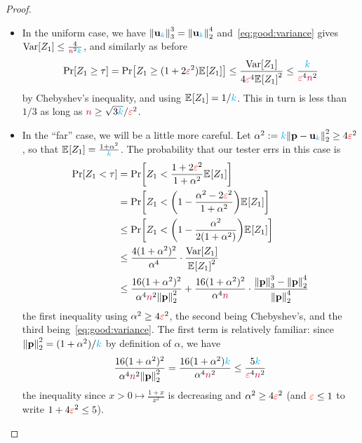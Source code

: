 \begin{proof}
  \begin{itemize}
    \item In the uniform case, we have $\norm{\uniform_\ab}_3^3=\normtwo{\uniform_\ab}^4$ and~\cref{eq:good:variance} gives $\operatorname{Var}[Z_1] \leq \frac{4}{{\textcolor{purple}{n}}^2{\textcolor{cyan}{k}}}$, and similarly as before
    \[
    \bPr{Z_1 \geq \tau} = \bPr{Z_1 \geq (1+2\dst^2)\bEE{Z_1}} \leq \frac{\Var[Z_1]}{4\dst^4\bEE{Z_1}^2}
    \leq \frac{\ab}{\dst^4\ns^2}
    \]
    by Chebyshev's inequality, and using $\bEE{Z_1}=1/\ab$. This in turn is less than $1/3$ as long as ${\textcolor{purple}{n}} \geq \sqrt{3{\textcolor{cyan}{k}}}/\textcolor{red}{\varepsilon}^2$.
    \item In the ``far'' case, we will be a little more careful. Let $\alpha^2 \eqdef \ab\normtwo{\p-\uniform_\ab}^2 \geq 4\dst^2$, so that $\bEE{Z_1} = \frac{1+\alpha^2}{\ab}$. The probability that our tester errs in this case is
    \begin{align*}
      \bPr{Z_1 < \tau} 
      &= \bPr{Z_1 < \frac{1+2\dst^2}{1+\alpha^2}\bEE{Z_1}} \\
      &= \bPr{Z_1 < \Paren{1-\frac{\alpha^2-2\dst^2}{1+\alpha^2}}\bEE{Z_1}} \\
      &\leq \bPr{Z_1 < \Paren{1-\frac{\alpha^2}{2(1+\alpha^2)}}\bEE{Z_1}} \\
      &\leq \frac{4(1+\alpha^2)^2}{\alpha^4}\cdot \frac{\Var[Z_1]}{\bEE{Z_1}^2} \\
      &\leq \frac{16(1+\alpha^2)^2}{\alpha^4\ns^2\normtwo{\p}^2} + \frac{16(1+\alpha^2)^2}{\alpha^4\ns}\cdot \frac{\norm{\p}_3^3-\normtwo{\p}^4}{\normtwo{\p}^4}
    \end{align*}
    the first inequality using $\alpha^2 \geq 4\textcolor{red}{\varepsilon}^2$, the second being Chebyshev's, and the third being~\cref{eq:good:variance}. The first term is relatively familiar: since $\normtwo{\p}^2 = (1+\alpha^2)/\ab$ by definition of $\alpha$, we have
    \begin{equation}
      \label{eq:annoying:collision:soundness:firstterm}
        \frac{16(1+\alpha^2)^2}{\alpha^4\ns^2\normtwo{\p}^2} = \frac{16(1+\alpha^2)\ab}{\alpha^4\ns^2} \leq \frac{5\ab}{\dst^4\ns^2}
    \end{equation}
    the inequality since $x>0 \mapsto \frac{1+x}{x^2}$ is decreasing and $\alpha^2\geq 4\textcolor{red}{\varepsilon}^2$ (and $\textcolor{red}{\varepsilon} \leq 1$ to write $1+4\textcolor{red}{\varepsilon}^2 \leq 5$). 
    

\end{itemize}
\end{proof}
